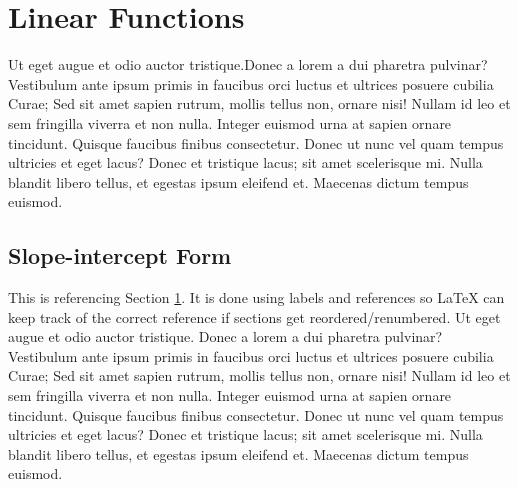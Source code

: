 \documentclass[12pt]{article}
\begin{document}
\section{Linear Functions}\label{sec:linear_functions}
Ut eget augue et odio auctor tristique.Donec a lorem a dui pharetra pulvinar?
Vestibulum ante ipsum primis in faucibus orci luctus et ultrices posuere cubilia
Curae; Sed sit amet sapien rutrum, mollis tellus non, ornare nisi! Nullam id leo
et sem fringilla viverra et non nulla. Integer euismod urna at sapien ornare
tincidunt. Quisque faucibus finibus consectetur. Donec ut nunc vel quam tempus
ultricies et eget lacus? Donec et tristique lacus; sit amet scelerisque mi.
Nulla blandit libero tellus, et egestas ipsum eleifend et. Maecenas dictum
tempus euismod.
  \subsection{Slope-intercept Form}
  This is referencing Section \ref{sec:linear_functions}. It is done using
  labels and references so LaTeX can keep track of the correct reference if
  sections get reordered/renumbered. Ut eget augue et odio auctor tristique.
  Donec a lorem a dui pharetra pulvinar?
  Vestibulum ante ipsum primis in faucibus orci luctus et ultrices posuere
  cubilia Curae; Sed sit amet sapien rutrum, mollis tellus non, ornare nisi!
  Nullam id leo et sem fringilla viverra et non nulla. Integer euismod urna at
  sapien ornare tincidunt. Quisque faucibus finibus consectetur. Donec ut nunc
  vel quam tempus ultricies et eget lacus? Donec et tristique lacus; sit amet
  scelerisque mi. Nulla blandit libero tellus, et egestas ipsum eleifend et.
  Maecenas dictum tempus euismod.
\end{document}
